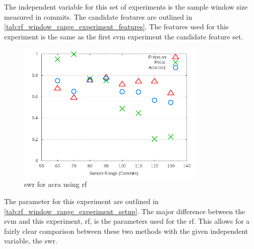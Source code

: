 The independent variable for this set of experiments is the sample window size measured in commits. The candidate features are outlined in \autoref{tab:rf_window_range_experiment_features}. The features used for this experiment is the same as the first \gls{svm} experiment the candidate feature set.



\begin{figure}[!t]
    \centering
        \includegraphics[width=0.8\textwidth]{images/rf/test_1/acra_sample_range}
        \caption{\gls{swr} for acra using \gls{rf}}
        \label{fig:test_1_acra_rf}
\end{figure}

The parameter for this experiment are outlined in \autoref{tab:rf_window_range_experiment_setup}. The major difference between the \gls{svm} and this experiment, \gls{rf}, is the parameters used for the \gls{rf}. This allows for a fairly clear comparison between these two methods with the given independent variable, the \gls{swr}.


